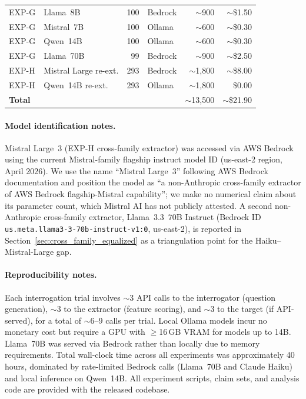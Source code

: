 \begin{table}[h]
\begin{small}
\begin{tabular}{llrlrr}
EXP-G & Llama~8B & 100 & Bedrock & $\sim$900 & $\sim$\$1.50 \\
EXP-G & Mistral~7B & 100 & Ollama & $\sim$600 & $\sim$\$0.30 \\
EXP-G & Qwen~14B & 100 & Ollama & $\sim$600 & $\sim$\$0.30 \\
EXP-G & Llama~70B & 99 & Bedrock & $\sim$900 & $\sim$\$2.50 \\
\midrule
EXP-H & Mistral Large re-ext. & 293 & Bedrock & $\sim$1,800 & $\sim$\$8.00 \\
EXP-H & Qwen~14B re-ext. & 293 & Ollama & $\sim$1,800 & \$0.00 \\
\midrule
\multicolumn{4}{l}{\textbf{Total}} & $\sim$13,500 & $\sim$\$21.90 \\
\bottomrule
\end{tabular}
\end{small}
\end{table}

\paragraph{Model identification notes.} Mistral Large~3 (EXP-H cross-family extractor) was accessed via AWS Bedrock using the current Mistral-family flagship instruct model ID (us-east-2 region, April 2026). We use the name ``Mistral Large~3'' following AWS Bedrock documentation and position the model as ``a non-Anthropic cross-family extractor of AWS Bedrock flagship-Mistral capability''; we make no numerical claim about its parameter count, which Mistral AI has not publicly attested. A second non-Anthropic cross-family extractor, Llama~3.3~70B Instruct (Bedrock ID \texttt{us.meta.llama3-3-70b-instruct-v1:0}, us-east-2), is reported in Section~\ref{sec:cross_family_equalized} as a triangulation point for the Haiku--Mistral-Large gap.

\paragraph{Reproducibility notes.} Each interrogation trial involves $\sim$3 API calls to the interrogator (question generation), $\sim$3 to the extractor (feature scoring), and $\sim$3 to the target (if API-served), for a total of $\sim$6--9 calls per trial. Local Ollama models incur no monetary cost but require a GPU with $\geq$16\,GB VRAM for models up to 14B. Llama~70B was served via Bedrock rather than locally due to memory requirements. Total wall-clock time across all experiments was approximately 40 hours, dominated by rate-limited Bedrock calls (Llama~70B and Claude Haiku) and local inference on Qwen~14B. All experiment scripts, claim sets, and analysis code are provided with the released codebase.

